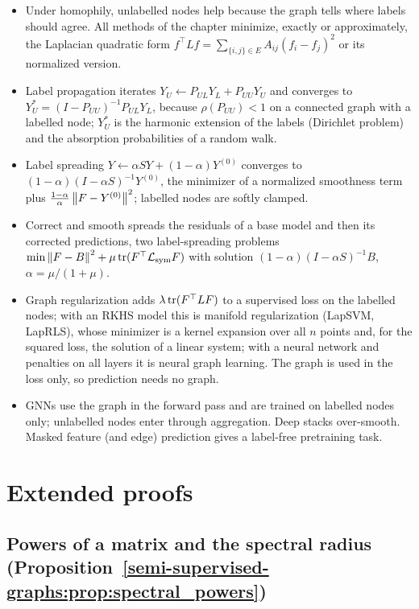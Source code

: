 \begin{notechapter}
\begin{chaptersummary}
\begin{itemize}
\item Under homophily, unlabelled nodes help because the graph tells where labels should agree. All methods of the chapter minimize, exactly or approximately, the Laplacian quadratic form $f^\top Lf = \sum_{\{i,j\}\in E}A_{ij}(f_i - f_j)^2$ or its normalized version.
\item Label propagation iterates $Y_U \leftarrow P_{UL}Y_L + P_{UU}Y_U$ and converges to $Y_U^* = (I - P_{UU})^{-1}P_{UL}Y_L$, because $\rho(P_{UU}) < 1$ on a connected graph with a labelled node; $Y_U^*$ is the harmonic extension of the labels (Dirichlet problem) and the absorption probabilities of a random walk.
\item Label spreading $Y \leftarrow \alpha SY + (1-\alpha)Y^{(0)}$ converges to $(1-\alpha)(I - \alpha S)^{-1}Y^{(0)}$, the minimizer of a normalized smoothness term plus $\frac{1-\alpha}{\alpha}\left\|F - Y^{(0)}\right\|^2$; labelled nodes are softly clamped.
\item Correct and smooth spreads the residuals of a base model and then its corrected predictions, two label-spreading problems $\min\left\|F - B\right\|^2 + \mu\operatorname{tr}(F^\top\mathcal L_{\mathrm{sym}}F)$ with solution $(1-\alpha)(I - \alpha S)^{-1}B$, $\alpha = \mu/(1+\mu)$.
\item Graph regularization adds $\lambda\operatorname{tr}(F^\top LF)$ to a supervised loss on the labelled nodes; with an RKHS model this is manifold regularization (LapSVM, LapRLS), whose minimizer is a kernel expansion over all $n$ points and, for the squared loss, the solution of a linear system; with a neural network and penalties on all layers it is neural graph learning. The graph is used in the loss only, so prediction needs no graph.
\item GNNs use the graph in the forward pass and are trained on labelled nodes only; unlabelled nodes enter through aggregation. Deep stacks over-smooth. Masked feature (and edge) prediction gives a label-free pretraining task.
\end{itemize}
\end{chaptersummary}

\chapterappendix
\section{Extended proofs}
\label{semi-supervised-graphs:app:proofs}

\subsection{Powers of a matrix and the spectral radius
  (Proposition~\ref{semi-supervised-graphs:prop:spectral_powers})}
\label{semi-supervised-graphs:app:spectral_radius}


\end{notechapter}
